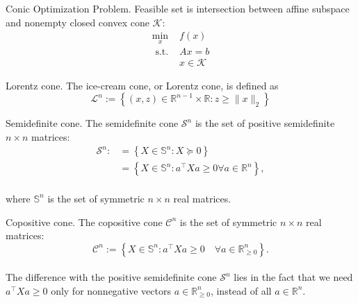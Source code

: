 
\begin{remark}[L9.1]{Conic Optimization Problem.}
    Feasible set is intersection between affine subspace and nonempty closed convex cone $\mathcal{K}$:
    \vspace{-4pt}\\
    $$
        \begin{array}{cl}
        \min _x & f(x) \\
        \text { s.t. } & A x=b \\
        & x \in \mathcal{K}
        \end{array}
    $$
    \vspace{-4pt}
\end{remark}


\begin{definition}[L9.1]{Lorentz cone.}
    The ice-cream cone, or Lorentz cone, is defined as
    \vspace{-4pt}\\
    $$
    \mathcal{L}^n:=\left\{(x, z) \in \mathbb{R}^{n-1} \times \mathbb{R}: z \geq\|x\|_2\right\}
    $$
    \vspace{-4pt}
\end{definition}

\begin{definition}[L9.2]{Semidefinite cone.}
    The semidefinite cone $\mathcal{S}^n$ is the set of positive semidefinite $n \times n$ matrices:
    \vspace{-4pt}\\
    $$
    \begin{aligned}
        \mathcal{S}^n :&=\left\{X \in \mathbb{S}^n: X \succeq 0\right\}\\
        &=\left\{X \in \mathbb{S}^n: a^{\top} X a \geq 0 \forall a \in \mathbb{R}^n\right\},
    \end{aligned}
    $$
    \vspace{-4pt}\\
    where $\mathbb{S}^n$ is the set of symmetric $n \times n$ real matrices.
\end{definition}

\begin{definition}[L9.3]{Copositive cone.}
    The copositive cone $\mathcal{C}^n$ is the set of symmetric $n \times n$ real matrices:
    \vspace{-4pt}\\
    $$
    \mathcal{C}^n:=\left\{X \in \mathbb{S}^n: a^{\top} X a \geq 0 \quad \forall a \in \mathbb{R}_{\geq 0}^n\right\} .
    $$
    \vspace{-4pt}\\
    The difference with the positive semidefinite cone $\mathcal{S}^n$ lies in the fact that we need $a^{\top} X a \geq 0$ only for nonnegative vectors $a \in \mathbb{R}_{\geq 0}^n$, instead of all $a \in \mathbb{R}^n$.
\end{definition}

